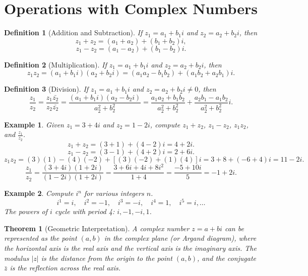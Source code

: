 \documentclass[11pt,a4paper]{article}
\newtheorem{example}{Example}
\newtheorem{theorem}{Theorem}
\newtheorem{definition}{Definition}
\begin{document}
\section{Operations with Complex Numbers}
\begin{definition}[Addition and Subtraction]
If $z_1 = a_1 + b_1 i$ and $z_2 = a_2 + b_2 i$, then
\[
z_1 + z_2 = (a_1 + a_2) + (b_1 + b_2) i,
\]
\[
z_1 - z_2 = (a_1 - a_2) + (b_1 - b_2) i.
\]
\end{definition}
\begin{definition}[Multiplication]
If $z_1 = a_1 + b_1 i$ and $z_2 = a_2 + b_2 i$, then
\[
z_1 z_2 = (a_1 + b_1 i)(a_2 + b_2 i) = (a_1 a_2 - b_1 b_2) + (a_1 b_2 + a_2 b_1) i.
\]
\end{definition}
\begin{definition}[Division]
If $z_1 = a_1 + b_1 i$ and $z_2 = a_2 + b_2 i \neq 0$, then
\[
\frac{z_1}{z_2} = \frac{z_1 \bar{z_2}}{z_2 \bar{z_2}} = \frac{(a_1 + b_1 i)(a_2 - b_2 i)}{a_2^2 + b_2^2} = \frac{a_1 a_2 + b_1 b_2}{a_2^2 + b_2^2} + \frac{a_2 b_1 - a_1 b_2}{a_2^2 + b_2^2} i.
\]
\end{definition}
\begin{example}
Given $z_1 = 3 + 4i$ and $z_2 = 1 - 2i$, compute $z_1 + z_2$, $z_1 - z_2$, $z_1 z_2$, and $\frac{z_1}{z_2}$.
\[
z_1 + z_2 = (3+1) + (4-2)i = 4 + 2i.
\]
\[
z_1 - z_2 = (3-1) + (4+2)i = 2 + 6i.
\]
\[
z_1 z_2 = (3)(1) - (4)(-2) + [(3)(-2) + (1)(4)]i = 3 + 8 + (-6 + 4)i = 11 - 2i.
\]
\[
\frac{z_1}{z_2} = \frac{(3+4i)(1+2i)}{(1-2i)(1+2i)} = \frac{3 + 6i + 4i + 8i^2}{1 + 4} = \frac{-5 + 10i}{5} = -1 + 2i.
\]
\end{example}
\begin{example}
Compute $i^n$ for various integers $n$.
\[
i^1 = i, \quad i^2 = -1, \quad i^3 = -i, \quad i^4 = 1, \quad i^5 = i, \dots
\]
The powers of $i$ cycle with period 4: $i, -1, -i, 1$.
\end{example}
\begin{theorem}[Geometric Interpretation]
A complex number $z = a + bi$ can be represented as the point $(a, b)$ in the \textit{complex plane} (or Argand diagram), where the horizontal axis is the real axis and the vertical axis is the imaginary axis. The modulus $|z|$ is the distance from the origin to the point $(a, b)$, and the conjugate $\bar{z}$ is the reflection across the real axis.
\end{theorem}
\begin{center}
\end{center}
\end{document}
